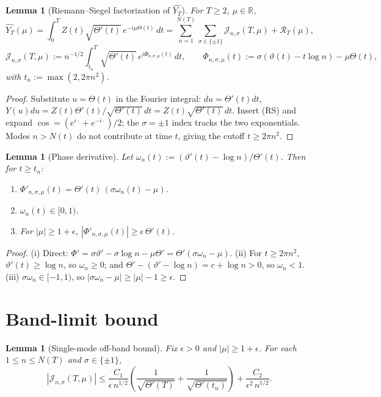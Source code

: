\documentclass[11pt]{article}
\newtheorem{lemma}[theorem]{Lemma}
\theoremstyle{definition}
\newcommand{\R}{\mathbb{R}}
\begin{document}
\begin{lemma}[Riemann--Siegel factorization of $\widehat{Y_T}$]\label{lem:modes}
For $T \geq 2$, $\mu \in \R$,
\[
\widehat{Y_T}(\mu) = \int_0^T Z(t)\sqrt{\Theta'(t)}\,e^{-i\mu\Theta(t)}\,dt = \sum_{n=1}^{N(T)}\sum_{\sigma \in \{\pm 1\}}\mathcal J_{n,\sigma}(T,\mu) + \mathcal R_T(\mu),
\]
\[
\mathcal J_{n,\sigma}(T,\mu) := n^{-1/2}\int_{t_n}^T \sqrt{\Theta'(t)}\,e^{i\Phi_{n,\sigma,\mu}(t)}\,dt,
\qquad \Phi_{n,\sigma,\mu}(t) := \sigma(\vartheta(t) - t\log n) - \mu\Theta(t),
\]
with $t_n := \max(2, 2\pi n^2)$.
\end{lemma}

\begin{proof}
Substitute $u = \Theta(t)$ in the Fourier integral: $du = \Theta'(t)dt$, $Y(u)du = Z(t)\Theta'(t)/\sqrt{\Theta'(t)}\,dt = Z(t)\sqrt{\Theta'(t)}\,dt$. Insert (RS) and expand $\cos = (e^{i\cdot} + e^{-i\cdot})/2$; the $\sigma = \pm 1$ index tracks the two exponentials. Modes $n > N(t)$ do not contribute at time $t$, giving the cutoff $t \geq 2\pi n^2$.
\end{proof}

\begin{lemma}[Phase derivative]\label{lem:phase}
Let $\omega_n(t) := (\vartheta'(t) - \log n)/\Theta'(t)$. Then for $t \geq t_n$:
\begin{enumerate}
\item[(i)] $\Phi'_{n,\sigma,\mu}(t) = \Theta'(t)\,(\sigma\omega_n(t) - \mu)$.
\item[(ii)] $\omega_n(t) \in [0, 1)$.
\item[(iii)] For $|\mu| \geq 1 + \epsilon$, $|\Phi'_{n,\sigma,\mu}(t)| \geq \epsilon\,\Theta'(t)$.
\end{enumerate}
\end{lemma}

\begin{proof}
(i) Direct: $\Phi' = \sigma\vartheta' - \sigma\log n - \mu\Theta' = \Theta'(\sigma\omega_n - \mu)$.
(ii) For $t \geq 2\pi n^2$, $\vartheta'(t) \geq \log n$, so $\omega_n \geq 0$; and $\Theta' - (\vartheta' - \log n) = c + \log n > 0$, so $\omega_n < 1$.
(iii) $\sigma\omega_n \in [-1, 1)$, so $|\sigma\omega_n - \mu| \geq |\mu| - 1 \geq \epsilon$.
\end{proof}

\section{Band-limit bound}

\begin{lemma}[Single-mode off-band bound]\label{lem:mode}
Fix $\epsilon > 0$ and $|\mu| \geq 1 + \epsilon$. For each $1 \leq n \leq N(T)$ and $\sigma \in \{\pm 1\}$,
\[
|\mathcal J_{n,\sigma}(T,\mu)| \leq \frac{C_1}{\epsilon\, n^{1/2}}\left(\frac{1}{\sqrt{\Theta'(T)}} + \frac{1}{\sqrt{\Theta'(t_n)}}\right) + \frac{C_2}{\epsilon^2\, n^{1/2}}.
\]
\end{lemma}
\end{document}
